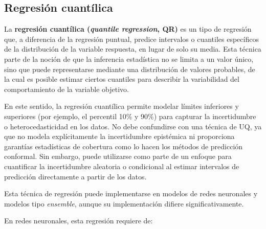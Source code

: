 
\subsection{Regresión cuantílica}

La \textbf{regresión cuantílica (\textit{quantile regression}, QR)} es un tipo de regresión que, a diferencia de la regresión puntual, predice intervalos o cuantiles específicos de la distribución de la variable respuesta, en lugar de solo su media. Esta técnica parte de la noción de que la inferencia estadística no se limita a un valor único, sino que puede representarse mediante una distribución de valores probables, de la cual es posible estimar ciertos cuantiles para describir la variabilidad del comportamiento de la variable objetivo.

En este sentido, la regresión cuantílica permite modelar límites inferiores y superiores (por ejemplo, el percentil 10\% y 90\%) para capturar la incertidumbre o heterocedasticidad en los datos. No debe confundirse con una técnica de UQ, ya que no modela explícitamente la incertidumbre epistémica ni proporciona garantías estadísticas de cobertura como lo hacen los métodos de predicción conformal. Sin embargo, puede utilizarse como parte de un enfoque para cuantificar la incertidumbre aleatoria o condicional al estimar intervalos de predicción directamente a partir de los datos.

Esta técnica de regresión puede implementarse en modelos de redes neuronales y modelos tipo \textit{ensemble}, aunque su implementación difiere significativamente. 

En redes neuronales, esta regresión requiere de:


